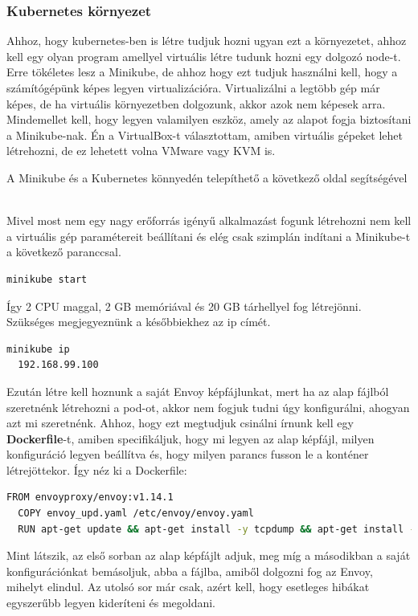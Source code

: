 \documentclass[a4paper,oneside]{article}
\begin{document}
\subsubsection{Kubernetes környezet}
Ahhoz, hogy kubernetes-ben is létre tudjuk hozni ugyan ezt a környezetet, ahhoz kell
egy olyan program amellyel virtuális létre tudunk hozni egy dolgozó node-t.
Erre tökéletes lesz a Minikube, de ahhoz hogy ezt tudjuk használni kell, hogy
a számítógépünk képes legyen virtualizációra. Virtualizálni a legtöbb
gép már képes, de ha virtuális környezetben dolgozunk, akkor azok nem képesek arra.
Mindemellet kell, hogy legyen valamilyen eszköz, amely az alapot fogja
biztosítani a Minikube-nak. Én a VirtualBox-t választottam, amiben
virtuális gépeket lehet létrehozni, de ez lehetett volna VMware vagy KVM is.

A Minikube és a Kubernetes könnyedén telepíthető a következő oldal
segítségével ~\cite{installkubectl}

Mivel most nem egy nagy erőforrás igényű alkalmazást fogunk létrehozni nem
kell a virtuális gép paramétereit beállítani és elég csak szimplán indítani a
Minikube-t a következő paranccsal.
\begin{lstlisting}[language=bash]
  minikube start
\end{lstlisting}
Így 2 CPU maggal, 2 GB memóriával és 20 GB tárhellyel fog létrejönni. Szükséges
megjegyeznünk a későbbiekhez az ip címét.
\begin{lstlisting}[language=bash]
  minikube ip
  192.168.99.100
\end{lstlisting}
Ezután létre kell hoznunk a saját Envoy képfájlunkat, mert ha az alap
fájlból szeretnénk létrehozni a pod-ot, akkor nem fogjuk tudni úgy
konfigurálni, ahogyan azt mi szeretnénk. Ahhoz, hogy ezt megtudjuk csinálni
írnunk kell egy \textbf{Dockerfile}-t, amiben specifikáljuk, hogy mi legyen az
alap képfájl, milyen konfiguráció legyen beállítva és, hogy milyen parancs
fusson le a konténer létrejöttekor. Így néz ki a Dockerfile:
\begin{lstlisting}[language=bash]
  FROM envoyproxy/envoy:v1.14.1
  COPY envoy_upd.yaml /etc/envoy/envoy.yaml
  RUN apt-get update && apt-get install -y tcpdump && apt-get install -y net-tools
\end{lstlisting}
Mint látszik, az első sorban az alap képfájlt adjuk, meg míg a másodikban a
saját konfigurációnkat bemásoljuk, abba a fájlba, amiből dolgozni fog az Envoy,
mihelyt elindul. Az utolsó sor már csak, azért kell, hogy esetleges hibákat
egyszerűbb legyen kideríteni és megoldani.
\end{document}
